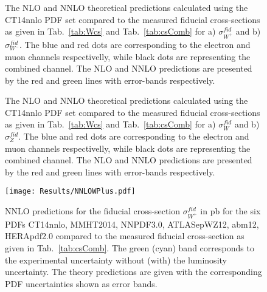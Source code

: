 \begin{figure}[!tbp]
\begin{minipage}[h]{0.45\linewidth}
\end{minipage}
\hfill
\begin{minipage}[h]{0.45\linewidth}
\end{minipage}
\caption{The NLO and NNLO theoretical predictions calculated using the CT14nnlo PDF set compared to the measured fiducial cross-sections as given in Tab.~\ref{tab:Wcs} and Tab.~\ref{tab:csComb} for a) $\sigma^{fid}_{W^{+}}$ and b) $\sigma^{fid}_{W^-}$. The blue and red dots are corresponding to the electron and muon channels respectivelly, while black dots are representing the combined channel. The NLO and NNLO predictions are presented by the red and green lines with error-bands respectively. }
\label{fig:WpNNLO}
\end{figure}

\begin{figure}[!tbp]
\begin{minipage}[h]{0.45\linewidth}
\end{minipage}
\hfill
\begin{minipage}[h]{0.45\linewidth}
\end{minipage}
\caption{The NLO and NNLO theoretical predictions calculated using the CT14nnlo PDF set compared to the measured fiducial cross-sections as given in Tab.~\ref{tab:Wcs} and Tab.~\ref{tab:csComb} for a) $\sigma^{fid}_W$ and b) $\sigma^{fid}_Z$. The blue and red dots are corresponding to the electron and muon channels respectivelly, while black dots are representing the combined channel. The NLO and NNLO predictions are presented by the red and green lines with error-bands respectively.}
\label{fig:Z}
\end{figure}

\begin{figure}[!tbp]
\begin{center}
\texttt{[image: Results/NNLOWPlus.pdf]}
\end{center}
\caption{ NNLO predictions for the fiducial cross-section $\sigma^{fid}_{W^{+}}$ in pb for the six PDFs CT14nnlo, MMHT2014, NNPDF3.0, ATLASepWZ12, abm12, HERApdf2.0 compared to the measured fiducial cross-section as given in Tab.~\ref{tab:csComb}. The green (cyan) band corresponds to the experimental uncertainty without (with) the luminosity uncertainty. The theory predictions are given with the corresponding PDF uncertainties shown as error bands. }
\label{fig:NNLODifPDFWP}
\end{figure}

